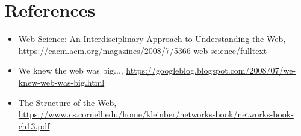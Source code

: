 \documentclass[12pt]{article}
\begin{document}
\section*{References}

\begin{itemize}
    \item {Web Science: An Interdisciplinary Approach to Understanding the Web, \url{https://cacm.acm.org/magazines/2008/7/5366-web-science/fulltext}}
    \item{We knew the web was big...,
    \url{https://googleblog.blogspot.com/2008/07/we-knew-web-was-big.html}}
    \item{The Structure of the Web,
    \url{https://www.cs.cornell.edu/home/kleinber/networks-book/networks-book-ch13.pdf}}
\end{itemize}
\end{document}
